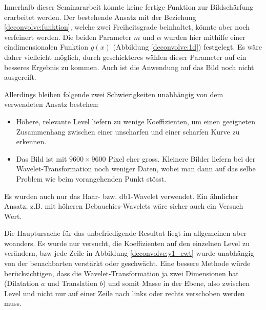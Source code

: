 Innerhalb dieser Seminararbeit konnte keine fertige Funktion zur Bildschärfung erarbeitet werden.
Der bestehende Ansatz mit der Beziehung \eqref{deconvolve:funktion}, welche zwei Freiheitsgrade beinhaltet, könnte aber noch verfeinert werden.
Die beiden Parameter $m$ und $\alpha$ wurden hier mithilfe einer eindimensionalen Funktion $g(x)$ (Abbildung \ref{deconvolve:1d}) festgelegt.
Es wäre daher vielleicht möglich, durch geschickteres wählen dieser Parameter auf ein besseres Ergebnis zu kommen.
Auch ist die Anwendung auf das Bild noch nicht ausgereift.

Allerdings bleiben folgende zwei Schwierigkeiten unabhängig von dem verwendeten Ansatz bestehen:
\begin{itemize}
	\item Höhere, relevante Level liefern zu wenige Koeffizienten, um einen geeigneten Zusammenhang zwischen einer unscharfen und einer scharfen Kurve zu erkennen.
	\item Das Bild ist mit $9600\times9600$ Pixel eher gross. Kleinere Bilder liefern bei der Wavelet-Transformation noch weniger Daten, wobei man dann auf das selbe Problem wie beim vorangehenden Punkt stösst.
\end{itemize}

Es wurden auch nur das Haar- bzw. db1-Wavelet verwendet.
Ein ähnlicher Ansatz, z.B. mit höheren Debauchies-Wavelets wäre sicher auch ein Versuch Wert.

Die Hauptursache für das unbefriedigende Resultat liegt im allgemeinen aber woanders.
Es wurde nur versucht, die Koeffizienten auf den einzelnen Level zu verändern, bzw jede Zeile in Abbildung \ref{deconvolve:y1_cwt} wurde unabhängig von der benachbarten verstärkt oder geschwächt.
Eine bessere Methode würde berücksichtigen, dass die Wavelet-Transformation ja zwei Dimensionen hat (Dilatation $a$ und Translation $b$) und somit \glqq Masse \grqq{} in der Ebene, also zwischen Level und nicht nur auf einer Zeile nach links oder rechts verschoben werden muss.

